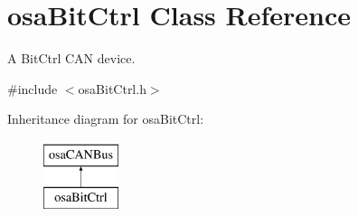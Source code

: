 \hypertarget{classosa_bit_ctrl}{\section{osa\-Bit\-Ctrl Class Reference}
\label{classosa_bit_ctrl}
}


A Bit\-Ctrl C\-A\-N device.  




{\ttfamily \#include $<$osa\-Bit\-Ctrl.\-h$>$}

Inheritance diagram for osa\-Bit\-Ctrl\-:\begin{figure}[H]
\begin{center}
\leavevmode
\includegraphics[height=2.000000cm]{d5/d34/classosa_bit_ctrl}
\end{center}
\end{figure}
